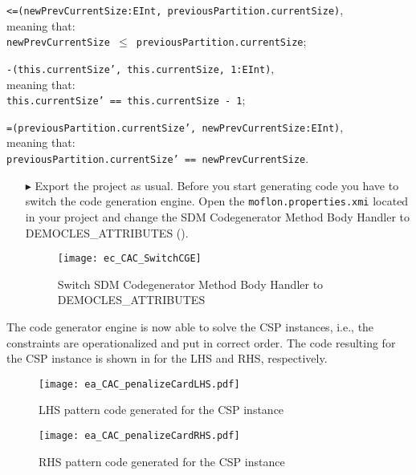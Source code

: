 \hspace*{0.5cm}\texttt{\small<=(newPrevCurrentSize:EInt, previousPartition.currentSize)},\\
meaning that:\\
\hspace*{0.5cm} \texttt{\small newPrevCurrentSize $\leq$ previousPartition.currentSize};

\hspace*{0.5cm}\texttt{\small-(this.currentSize', this.currentSize, 1:EInt)},\\
meaning that:\\
\hspace*{0.5cm} \texttt{\small this.currentSize' == this.currentSize - 1};

\hspace*{0.5cm}\texttt{\small=(previousPartition.currentSize', newPrevCurrentSize:EInt)},\\
meaning that:\\
\hspace*{0.5cm} \texttt{\small previousPartition.currentSize' == newPrevCurrentSize}.
\begin{itemize}    
\item[$\blacktriangleright$] Export the project as usual. Before you start generating code you have to switch the code generation engine. Open the \texttt{moflon.properties.xmi} located in your project and change the \textsf{SDM Codegenerator Method Body Handler} to  \textsf{DEMOCLES\_ATTRIBUTES} ().

\begin{figure}[htbp]
\begin{center}
  \texttt{[image: ec\_CAC\_SwitchCGE]}
  \caption{Switch \textsf{SDM Codegenerator Method Body Handler} to \textsf{DEMOCLES\_ATTRIBUTES}}  
  \label{ec_CAC_SwitchCGE}
\end{center}
\end{figure}

\end{itemize}
The code generator engine is now able to solve the CSP instances, i.e., the constraints are operationalized and put in correct order. 
The code resulting for the CSP instance is shown in  for the LHS and RHS, respectively.
\begin{figure}[htbp]
\begin{center}
  \texttt{[image: ea\_CAC\_penalizeCardLHS.pdf]}
  \caption{LHS pattern code generated for the CSP instance}  
  \label{ea_CAC_penalizeCardLHS}
\end{center}
\end{figure}
\begin{figure}[htbp]
\begin{center}
  \texttt{[image: ea\_CAC\_penalizeCardRHS.pdf]}
  \caption{RHS pattern code generated for the CSP instance}  
  \label{ea_CAC_penalizeCardRHS}
\end{center}
\end{figure}

